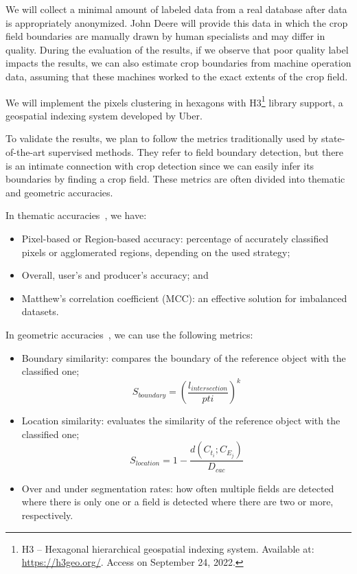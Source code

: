 \documentclass[12pt]{article}
\begin{document}
We will collect a minimal amount of labeled data from a real database after data is appropriately anonymized. John Deere will provide this data in which the crop field boundaries are manually drawn by human specialists and may differ in quality. During the evaluation of the results, if we observe that poor quality label impacts the results, we can also estimate crop boundaries from machine operation data, assuming that these machines worked to the exact extents of the crop field.

We will implement the pixels clustering in hexagons with H3\footnote{H3 -- Hexagonal hierarchical geospatial indexing system. Available at: \url{https://h3geo.org/}. Access on September 24, 2022.} library support, a geospatial indexing system developed by Uber.


To validate the results, we plan to follow the metrics traditionally used by state-of-the-art supervised methods. They refer to field boundary detection, but there is an intimate connection with crop detection since we can easily infer its boundaries by finding a crop field. These metrics are often divided into thematic and geometric accuracies.

In thematic accuracies~\citep{lizarazo2014}, we have:
\begin{itemize}
    \item Pixel-based or Region-based accuracy: percentage of accurately classified pixels or agglomerated regions, depending on the used strategy;
    \item Overall, user's and producer's accuracy; and
    \item Matthew's correlation coefficient (MCC): an effective solution for imbalanced datasets.
\end{itemize}

In geometric accuracies~\citep{lizarazo2014}, we can use the following metrics:
\begin{itemize}
\item Boundary similarity: compares the boundary of the reference object with the classified one;
\[
S_{boundary}=\left({\frac{l_{intersection}}{pti}}\right)^k
\]
\item Location similarity: evaluates the similarity of the reference object with the classified one;
\[ 
S_{location}=1-\frac{d(C_{t_i};C_{E_j})}{D_{cac}}
\]
\item Over and under segmentation rates: how often multiple fields are detected where there is only one or a field is detected where there are two or more, respectively.
\end{itemize}
\end{document}
